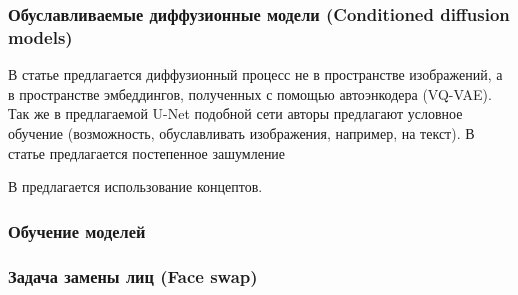 \subsubsection{Обуславливаемые диффузионные модели (Conditioned diffusion models)}
\par
В статье \cite{rombach2022highresolution} предлагается диффузионный процесс не в пространстве изображений, а в пространстве эмбеддингов, полученных с помощью автоэнкодера (VQ-VAE). Так же в предлагаемой U-Net подобной сети авторы предлагают условное обучение (возможность, обуславливать изображения, например, на текст). В статье \cite{sohldickstein2015deep} предлагается постепенное зашумление 

В \cite{ruiz2023dreambooth} предлагается использование концептов. 




\subsubsection{Обучение моделей}
\par

\subsubsection{Задача замены лиц (Face swap)}

\par

